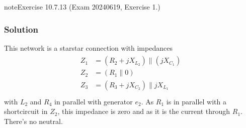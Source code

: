 \documentclass[letterpaper,10pt,italian]{jupyterBook}
\begin{document}
\begin{sphinxadmonition}{note}{Exercise 10.7.13 (Exam 2024\sphinxhyphen{}06\sphinxhyphen{}19, Exercise 1.)}



\begin{figure}[htbp]
\centering

\noindent{}
\end{figure}
\subsubsection*{Solution}

\sphinxAtStartPar
This network is a star\sphinxhyphen{}star connection with impedances
\begin{equation*}
\begin{split}\begin{aligned}
  Z_1 & = ( R_2 + j X_{L_2} ) \parallel ( j X_{C_1} ) \\
  Z_2 & = ( R_1 \parallel 0 ) \\
  Z_3 & = ( R_3 + j X_{C_2} ) \parallel j X_{L_1} \\
\end{aligned}\end{split}
\end{equation*}
\sphinxAtStartPar
with \(L_2\) and \(R_4\) in parallel with generator \(e_2\). As \(R_1\) is in parallel with a short\sphinxhyphen{}circuit in \(Z_2\), this impedance is zero and as it is the current through \(R_1\). There’s no neutral.


\end{sphinxadmonition}
\end{document}
